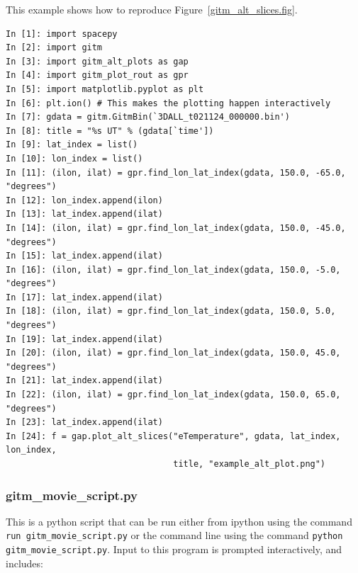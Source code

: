 This example shows how to reproduce Figure~\ref{gitm_alt_slices.fig}.

\begin{verbatim}
In [1]: import spacepy
In [2]: import gitm
In [3]: import gitm_alt_plots as gap
In [4]: import gitm_plot_rout as gpr
In [5]: import matplotlib.pyplot as plt
In [6]: plt.ion() # This makes the plotting happen interactively
In [7]: gdata = gitm.GitmBin(`3DALL_t021124_000000.bin')
In [8]: title = "%s UT" % (gdata[`time'])
In [9]: lat_index = list()
In [10]: lon_index = list()
In [11]: (ilon, ilat) = gpr.find_lon_lat_index(gdata, 150.0, -65.0, "degrees")
In [12]: lon_index.append(ilon)
In [13]: lat_index.append(ilat)
In [14]: (ilon, ilat) = gpr.find_lon_lat_index(gdata, 150.0, -45.0, "degrees")
In [15]: lat_index.append(ilat)
In [16]: (ilon, ilat) = gpr.find_lon_lat_index(gdata, 150.0, -5.0, "degrees")
In [17]: lat_index.append(ilat)
In [18]: (ilon, ilat) = gpr.find_lon_lat_index(gdata, 150.0, 5.0, "degrees")
In [19]: lat_index.append(ilat)
In [20]: (ilon, ilat) = gpr.find_lon_lat_index(gdata, 150.0, 45.0, "degrees")
In [21]: lat_index.append(ilat)
In [22]: (ilon, ilat) = gpr.find_lon_lat_index(gdata, 150.0, 65.0, "degrees")
In [23]: lat_index.append(ilat)
In [24]: f = gap.plot_alt_slices("eTemperature", gdata, lat_index, lon_index, 
                                 title, "example_alt_plot.png")
\end{verbatim}

\subsubsection{gitm\_movie\_script.py}

This is a python script that can be run either from ipython using the command {\tt run gitm\_movie\_script.py} or the command line using the command {\tt python gitm\_movie\_script.py}.  Input to this program is prompted interactively, and includes:


